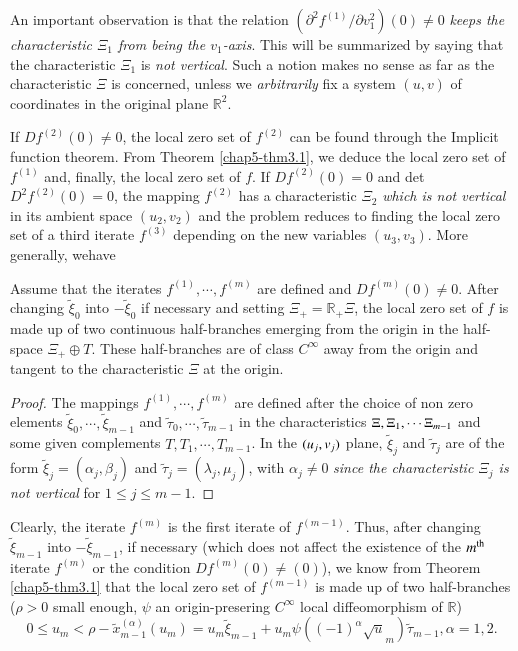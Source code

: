 An important observation is that the relation $(\partial^{2}f^{(1)} /
\partial v_{1}^{2})(0) \neq 0$ {\em keeps the characteristic $\Xi_{1}$ from
being the $v_{1}$-axis}. This will be summarized by saying that the
characteristic $\Xi_{1}$ is {\em not vertical}. Such a notion makes no
sense as far as the characteristic $\Xi$ is concerned, unless we {\em
  arbitrarily} fix a system $(u, v)$ of coordinates in the original
plane $\mathbb{R}^{2}$.

If $Df^{(2)} (0) \neq 0$, the local zero set of $f^{(2)}$ can be found
through the Implicit function theorem. From Theorem
\ref{chap5-thm3.1}, we deduce the local zero set of $f^{(1)}$ and,
finally, the local zero set of $f$. If $Df^{(2)} (0) = 0$ and det
$D^{2}f^{(2)} (0) = 0$, the mapping $f^{(2)}$ has a characteristic
$\Xi_{2}$ {\em which is not vertical} in its ambient space $(u_{2},
v_{2})$ and the problem reduces to finding the local zero set of a
third iterate $f^{(3)}$ depending on the new variables $(u_{3},
v_{3})$. More generally, we\pageoriginale have

\begin{theorem}\label{chap5-thm5.1}
Assume that the iterates $f^{(1)}, \cdots , f^{(m)}$ are defined and
$Df^{(m)} (0) \neq 0$. After changing $\widetilde{\xi}_{0}$ into
$-\widetilde{\xi}_{0}$ if necessary and setting $\Xi_{+} =
\mathbb{R}_{+} \Xi$, the local zero set of $f$ is made up of two
continuous half-branches emerging from the origin in the half-space
$\Xi_{+} \oplus T$. These half-branches are of class $C^{\infty}$ away
from the origin and tangent to the characteristic $\Xi$ at the origin.
\end{theorem}

\begin{proof}
The mappings $f^{(1)}, \cdots, f^{(m)}$ are defined after the choice
of non zero elements $\widetilde{\xi}_{0}, \cdots,
\widetilde{\xi}_{m-1}$ and $\widetilde{\tau}_{0}, \cdots ,
\widetilde{\tau}_{m-1}$ in the characteristics $\Xi,\break \Xi_{1}, \cdots
\Xi_{m-1}$ and some given complements $T, T_{1}, \cdots, T_{m-1}$. In
the $(u_{j},\break v_{j})$ plane, $\widetilde{\xi}_{j}$ and
$\widetilde{\tau}_{j}$ are of the form $\widetilde{\xi}_{j} =
(\alpha_{j}, \beta_{j})$ and $\widetilde{\tau}_{j} = (\lambda_{j},
\mu_{j})$, with $\alpha_{j} \neq 0$ {\em since the characteristic $\Xi_{j}$
is not vertical} for $1 \leq j \leq m-1$.
\end{proof}

Clearly, the iterate $f^{(m)}$ is the first iterate of
$f^{(m-1)}$. Thus, after changing $\widetilde{\xi}_{m-1}$ into
$-\widetilde{\xi}_{m-1}$, if necessary (which does not affect the
existence of the $m^{\rm th}$ iterate $f^{(m)}$ or the condition $Df^{(m)}(0)
\neq (0)$), we know from Theorem \ref{chap5-thm3.1} that the local
zero set of $f^{(m-1)}$ is made up of two half-branches ($\rho > 0$
small enough, $\psi$ an origin-presering $C^{\infty}$ local
diffeomorphism of $\mathbb{R}$)
$$
0 \leq u_{m} < \rho - \widetilde{x}_{m-1}^{(\alpha)} (u_{m}) =
u_{m}\widetilde{\xi}_{m-1} + u_{m}\psi((-1)^{\alpha} \surd
u_{m})\widetilde{\tau}_{m-1}, \alpha = 1, 2.
$$

